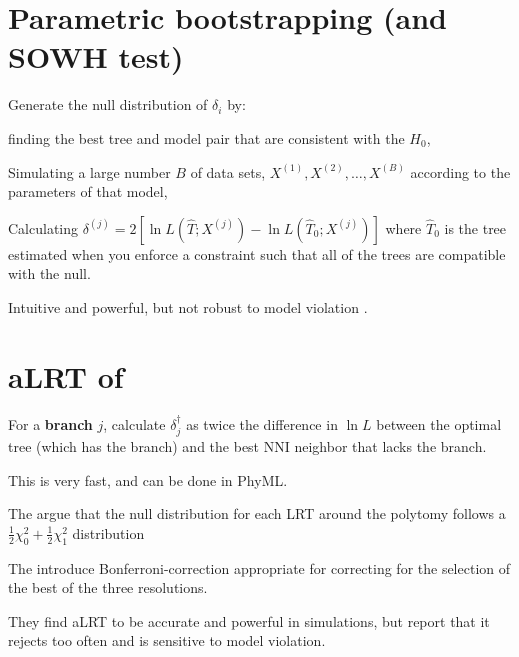 \documentclass[landscape]{foils}
\begin{document}
\myNewSlide
\section*{Parametric bootstrapping (and SOWH test)}
Generate the null distribution of $\delta_i$ by:
\begin{compactitem}
	\item finding the best tree and model pair that are consistent with the $H_0$,
	\item Simulating a large number $B$ of data sets, $X^{(1)}, X^{(2)},\ldots,X^{(B)}$ according to the parameters of that model,
	\item Calculating $\delta^{(j)} = 2\left[\ln L (\hat{T}; X^{(j)}) - \ln L (\hat{T}_{0}; X^{(j)})\right]$ where $\hat{T}_{0}$ is the tree estimated when you enforce a constraint such that all of the trees are compatible with the null.
\end{compactitem}

Intuitive and powerful, but not robust to model violation \citep{Buckley2002}.

\myNewSlide
 


\myNewSlide
 

\myNewSlide
\section*{aLRT of \citet{AnisimovaG2006}}
\begin{compactitem}
	\item For a {\bf branch} $j$, calculate $\delta_{j}^{\dag}$ as twice the difference in $\ln L$ between the optimal tree (which has the branch) and the best NNI neighbor that lacks the branch.
	\item This is very fast, and can be done in PhyML.
	\item The argue that the null distribution for each LRT around the polytomy follows a $\frac{1}{2}\chi_0^2 + \frac{1}{2}\chi_1^2$ distribution
	\item The introduce Bonferroni-correction appropriate for correcting for the selection of the best of the three resolutions.
	\item They find aLRT to be accurate and powerful in simulations, but \citet{AnisimovaGDDG2011} report that it rejects too often and is sensitive to model violation.
\end{compactitem}
	
\end{document}
